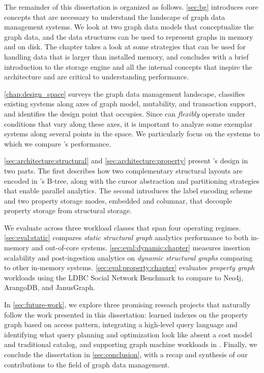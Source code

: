 The remainder of this dissertation is organized as follows.
\autoref{sec:bg} introduces core concepts that are necessary to understand the landscape of graph data management systems. 
We look at two graph data models that conceptualize the graph data, and the data structures can be used to represent graphs in memory and on disk.
The chapter takes a look at some strategies that can be used for handling data that is larger than installed memory, and concludes with a brief introduction to the \wt{} storage engine and all the internal concepts that inspire the \project{} architecture and are critical to understanding performance.

\autoref{chap:design_space} surveys the graph data management landscape, classifies existing systems along axes of graph model, mutability, and transaction support, and identifies the design point that \project{} occupies.
Since \project{} can \emph{flexibly} operate under conditions that vary along these axes, it is important to analyze some exemplar systems along several points in the space.
We particularly focus on the systems to which we compare \project{}'s performance.

\autoref{sec:architecture:structural} and \autoref{sec:architecture:property} present \project{}'s design in two parts.
The first describes how two complementary structural layouts are encoded in \wt{}'s B-tree, along with the cursor abstraction and partitioning strategies that enable parallel analytics.
The second introduces the label encoding scheme and two property storage modes, embedded and columnar, that decouple property storage from structural storage.

We evaluate \project{} across three workload classes that span four operating regimes. 
\autoref{sec:eval:static} compares \emph{static structural graph} analytics performance to both in-memory and out-of-core systems.
\autoref{sec:eval:dynamic:chapter} measures insertion scalability and post-ingestion analytics on \emph{dynamic structural graphs} comparing to other in-memory systems.
\autoref{sec:eval:property:chapter} evaluates \emph{property graph} workloads using the LDBC Social Network Benchmark to compare to Neo4j, ArangoDB, and JanusGraph.

In \autoref{sec:future-work}, we explore three promising reseach projects that naturally follow the work presented in this dissertation: learned indexes on the property graph based on access pattern, integrating a high-level query language and identifying what query planning and optimization look like absent a cost model and traditional catalog, and supporting graph machine workloads in \project{}.
Finally, we conclude the dissertation in \autoref{sec:conclusion}, with a recap and synthesis of our contributions to the field of graph data management.